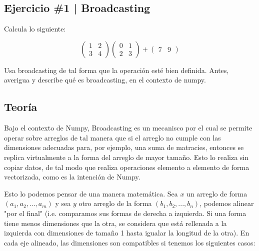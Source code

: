 \newpage

\begin{myblock}
\section*{Ejercicio \#1 | Broadcasting}

Calcula lo siguiente:

\[
    \begin{pmatrix} 1 & 2 \\ 3 & 4 \end{pmatrix} 
    \begin{pmatrix} 0 & 1 \\ 2 & 3 \end{pmatrix} + 
    \begin{pmatrix} 7 & 9 \end{pmatrix}
\]

Usa broadcasting de tal forma que la operación esté bien definida. Antes, 
averigua y describe qué es broadcasting, en el contexto de numpy. 

\end{myblock}



\subsection{Teoría}

Bajo el contexto de Numpy, Broadcasting es un mecanisco por el cual se permite operar sobre arreglos 
de tal manera que si el arreglo no cumple con las dimensiones adecuadas para, por ejemplo, una suma 
de matracies, entonces se replica virtualmente a la forma del arreglo de mayor tamaño. Esto lo realiza
sin copiar datos, de tal modo que realiza operaciones elemento a elemento de forma vectorizada, como
es la intención de Numpy. 

Esto lo podemos pensar de una manera matemática. Sea $x$ un arreglo de forma $(a_1, a_2,..., a_m)$ y 
sea $y$ otro arreglo de la forma $(b_1, b_2,...,b_n)$, podemos alinear "por el final" (i.e. 
comparamos sus formas de derecha a izquierda. Si una forma tiene menos dimensiones que la otra, se 
considera que está rellenada a la izquierda con dimensiones de tamaño 1 hasta igualar la longitud 
de la otra). En cada eje alineado, las dimensiones son compatibles si tenemos los siguientes casos:

